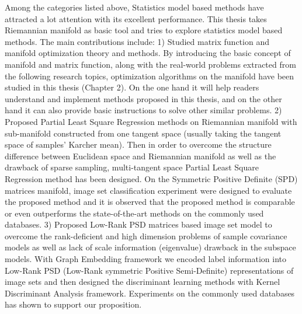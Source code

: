 \begin{eabstract}
Among the categories listed above, Statistics model based methods have attracted a lot attention with its excellent performance. This thesis takes Riemannian manifold as basic tool and tries to explore statistics model based methods. The main contributions include: 1) Studied matrix function and manifold optimization theory and methods. By introducing the basic concept of manifold and matrix function, along with the real-world problems extracted from the following research topics, optimization algorithms on the manifold have been studied in this thesis (Chapter 2). On the one hand it will help readers understand and implement methods proposed in this thesis, and on the other hand it can also provide basic instructions to solve other similar problems. 2) Proposed Partial Least Square Regression methods on Riemannian manifold with sub-manifold constructed from one tangent space (usually taking the tangent space of samples’ Karcher mean). Then in order to overcome the structure difference between Euclidean space and Riemannian manifold as well as the drawback of sparse sampling, multi-tangent space Partial Least Square Regression method has been designed. On the Symmetric Positive Definite (SPD) matrices manifold, image set classification experiment were designed to evaluate the proposed method and it is observed that the proposed method is comparable or even outperforms the state-of-the-art methods on the commonly used databases. 3) Proposed Low-Rank PSD matrices based image set model to overcome the rank-deficient and high dimension problems of sample covariance models as well as lack of scale information (eigenvalue) drawback in the subspace models. With Graph Embedding framework we encoded label information into Low-Rank PSD (Low-Rank symmetric Positive Semi-Definite) representations of image sets and then designed the discriminant learning methods with Kernel Discriminant Analysis framework. Experiments on the commonly used databases has shown to support our proposition.

%
%
\end{eabstract}

